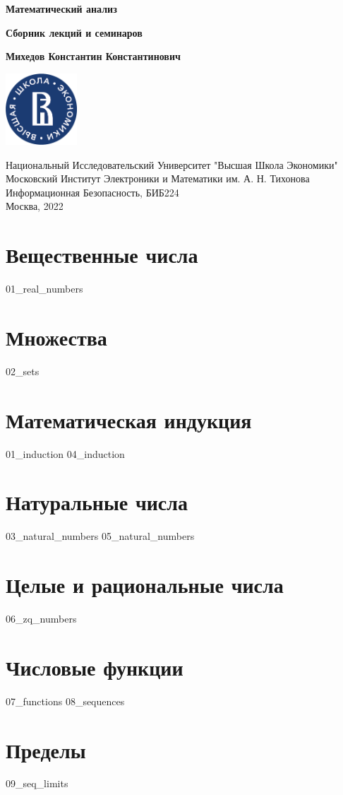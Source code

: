 \documentclass[a4paper,12pt]{article}
\begin{document}
  \begin{titlepage}
    \begin{center}
      \vspace*{1.5cm}

      \Huge
      \textbf{Математический анализ}

      \vspace{0.5cm} \large
      \textbf{Сборник лекций и семинаров}

      \vspace{1.5cm} \normalsize
      \textbf{Михедов Константин Константинович}

      \vfill

      \includegraphics[width=0.2\textwidth]{hse_logo}

      \vspace{1cm} \footnotesize
      Национальный Исследовательский Университет "Высшая Школа Экономики" \\
      Московский Институт Электроники и Математики им. А. Н. Тихонова \\
      Информационная Безопасность, БИБ224 \\
      Москва, 2022
    \end{center}
  \end{titlepage}

  \section{Вещественные числа}
  {01_real_numbers}

  \section{Множества}
  {02_sets}

  \section{Математическая индукция}
  {01_induction}
  {04_induction}

  \section{Натуральные числа}
  {03_natural_numbers}
  {05_natural_numbers}

  \section{Целые и рациональные числа}
  {06_zq_numbers}

  \section{Числовые функции}
  {07_functions}
  {08_sequences}

  \section{Пределы}
  {09_seq_limits}
\end{document}
